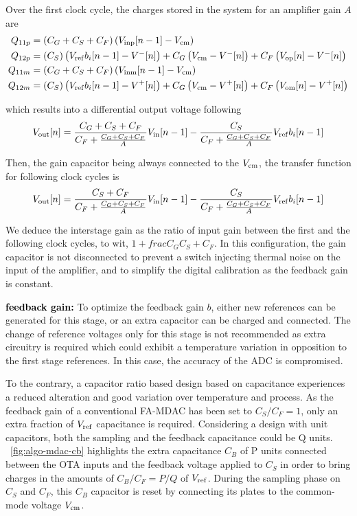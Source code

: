 Over the first clock cycle, the charges stored in the system for an amplifier gain $A$ are
\begin{align}
Q_{11p} &= \left(C_G+C_S+C_F \right) \left( V_{\rm inp}[n-1] - V_{\rm cm} \right)\\
Q_{12p} &= \left(C_S \right) \left( V_{\rm ref}b_i[n-1] - V^{-}[n] \right) + C_G \left(V_{\rm cm}-V^{-}[n] \right)  + C_F \left(V_{\rm op}[n]-V^{-}[n] \right) \\
Q_{11m} &= \left(C_G+C_S+C_F \right) \left( V_{\rm inm}[n-1] - V_{\rm cm} \right) \\
Q_{12m} &= \left(C_S \right) \left( V_{\rm ref}b_i[n-1] - V^{+}[n] \right) + C_G \left(V_{\rm cm}-V^{+}[n] \right)  + C_F \left(V_{\rm om}[n]-V^{+}[n] \right)
\end{align}

which results into a differential output voltage following 
\begin{equation}
	V_{\rm out}[n] = \frac{C_G+C_S+C_F}{C_F+\frac{C_G+C_S+C_F}{A}} V_{\rm in}[n-1] - \frac{C_S}{C_F+\frac{C_G+C_S+C_F}{A}} V_{\rm ref}b_i[n-1]
\end{equation}

Then, the gain capacitor being always connected to the $V_{\rm cm}$, the transfer function for following clock cycles is 
\begin{equation}
	V_{\rm out}[n] = \frac{C_S+C_F}{C_F+\frac{C_G+C_S+C_F}{A}} V_{\rm in}[n-1] - \frac{C_S}{C_F+\frac{C_G+C_S+C_F}{A}} V_{\rm ref}b_i[n-1]
\end{equation}

We deduce the interstage gain as the ratio of input gain between the first and the following clock cycles, to wit, $1+frac{C_G}{C_S+C_F}$.  In this configuration, the gain capacitor is not disconnected to prevent a switch injecting thermal noise on the input of the amplifier, and to simplify the digital calibration as the feedback gain is constant.

\textbf{\textcolor{black}{feedback gain:}}
To optimize the feedback gain $b$, either new references can be generated for this stage, or an extra capacitor can be charged and connected. The change of reference voltages only for this stage is not recommended as extra circuitry is required which could exhibit a temperature variation in opposition to the first stage references. In this case, the accuracy of the ADC is compromised.

To the contrary, a capacitor ratio based design based on capacitance experiences a reduced alteration and good variation over temperature and process. As the feedback gain of a conventional FA-MDAC has been set to \(C_S/C_F = 1\), only an extra fraction of \(V_{\rm ref}\) capacitance is required. Considering a design with unit capacitors, both the sampling and the feedback capacitance could be Q units. \figurename~\ref{fig:algo-mdac-cb} highlights the extra capacitance \(C_B\) of P units connected between the OTA inputs and the feedback voltage applied to \(C_S\) in order to bring charges in the amounts of \(C_B/C_F = P/Q\) of \(V_{\rm ref}\). During the sampling phase on \(C_S\) and \(C_F\), this \(C_B\) capacitor is reset by connecting its plates to the common-mode voltage \(V_{\rm cm}\).

